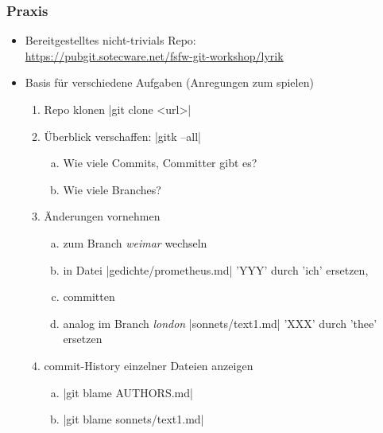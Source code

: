 \documentclass{beamer}
\begin{document}
\begin{frame}[fragile,label=uebung10]
\frametitle{Praxis}
\begin{itemize}
 \item Bereitgestelltes nicht-trivials Repo:\\
 {\scriptsize \url{https://pubgit.sotecware.net/fsfw-git-workshop/lyrik}}
 \item Basis für verschiedene Aufgaben (Anregungen zum spielen)
\begin{enumerate}
 \item Repo klonen \cverb|git clone <url>|
 \item Überblick verschaffen: \cverb|gitk --all|
 \begin{enumerate}[a)]
  \item Wie viele Commits, Committer gibt es?
  \item Wie viele Branches?
 \end{enumerate}
 \item Änderungen vornehmen
 \begin{enumerate}[a)]
 \item zum Branch \textit{weimar} wechseln
 \item in Datei \cverb|gedichte/prometheus.md| 'YYY' durch 'ich' ersetzen,
 \item committen
 \item analog im Branch \textit{london} \cverb|sonnets/text1.md| 'XXX' durch 'thee' ersetzen
 \end{enumerate}
 \item commit-History einzelner Dateien anzeigen
 \begin{enumerate}[a)]
  \item \cverb|git blame AUTHORS.md|
  \item \cverb|git blame sonnets/text1.md|
 \end{enumerate}
\setcounter{taskcounter}{\value{enumi}}
\end{enumerate}

\end{itemize}

\end{frame}


\end{document}
